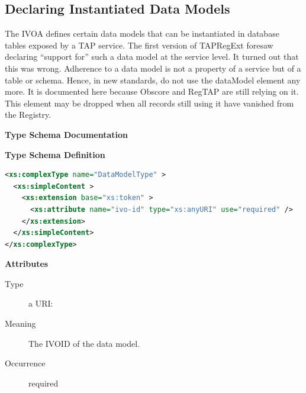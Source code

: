 \documentclass{ivoa}
\begin{document}
\subsection{Declaring Instantiated Data Models}

\label{dms}

The IVOA defines certain data models that can be instantiated in database
tables exposed by a TAP service.  The first version of TAPRegExt
foresaw declaring ``support for'' such a data model at the service
level.  It turned out that this was wrong.  Adherence to a data model is
not a property of a service but of a table or schema.  Hence, in new
standards, do not use the dataModel element any more.  It is
documented here because Obscore and RegTAP are still relying on it.
This  element may be dropped when all records still
using it have vanished from the Registry.

\begin{generated}
\begingroup
        \renewcommand*\descriptionlabel[1]{%
        \hbox to 5.5em{\emph{#1}\hfil}}\vspace{2ex}\noindent\textbf{ Type Schema Documentation}


\vspace{1ex}\noindent\textbf{ Type Schema Definition}

\begin{lstlisting}[language=XML,basicstyle=\footnotesize]
<xs:complexType name="DataModelType" >
  <xs:simpleContent >
    <xs:extension base="xs:token" >
      <xs:attribute name="ivo-id" type="xs:anyURI" use="required" />
    </xs:extension>
  </xs:simpleContent>
</xs:complexType>
\end{lstlisting}

\vspace{0.5ex}\noindent\textbf{ Attributes}

\begingroup\small\begin{bigdescription}
\item[ivo-id]
\begin{description}
\item[Type] a URI: 
\item[Meaning] The IVOID of the data model.
\item[Occurrence] required
\end{description}


\end{bigdescription}\endgroup

\endgroup
\end{generated}
\end{document}
